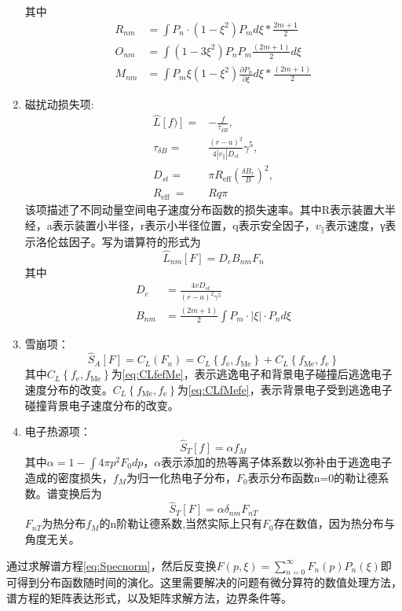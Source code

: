 \begin{enumerate}
\begin{equation}
\end{equation}
其中
\begin{align}R_{n m} & = \int P_{n} \cdot\left(1-\xi^{2}\right) P_{m} d \xi * \frac{2 m+1}{2} \\O_{n m} & = \int\left(1-3 \xi^{2}\right) P_{n} P_{m} \frac{(2 m+1)}{2} d \xi \\M_{n m} & = \int P_{m} \xi\left(1-\xi^{2}\right) \frac{\partial P_{n}}{\partial \xi} d \xi * \frac{(2 m+1)}{2}\end{align}
\item
磁扰动损失项\cite{RN2076}:
\begin{equation}
\begin{aligned}\widehat{L}[f)]  = &-\frac{f}{\tau_{\delta B}}, \\\tau_{\delta B}  = &\frac{(r-a)^{2}}{4\left|v_{\|}\right| D_{s t}} \gamma^{5}, \\D_{s t} = &\pi R_{\mathrm{eff}}\left(\frac{\delta B_{r}}{B}\right)^{2}, \\R_{\text {eff }}  = &R q \pi\end{aligned}
\end{equation}
该项描述了不同动量空间电子速度分布函数的损失速率。其中R表示装置大半经，a表示装置小半径，r表示小半径位置，q表示安全因子，$v_∥$表示速度，γ表示洛伦兹因子。写为谱算符的形式为
\begin{equation}
\widehat{L}_{n m}[F]=D_{c} B_{n m} F_{n}
\end{equation}
其中
\begin{align}D_{c} & = \frac{4 v D_{s t}}{(r-a)^{2} \gamma^{5}} \\B_{n m} & = \frac{(2 m+1)}{2} \int P_{m} \cdot|\xi| \cdot P_{n} d \xi\end{align}

\item
雪崩项：
\begin{equation}
\hat{S}_{A}[F]=C_{L}\left(F_{n}\right)=C_{L}\left\{f_{\mathrm{e}}, f_{\mathrm{Me}}\right\}+C_{L}\left\{f_{\mathrm{Me}}, f_{\mathrm{e}}\right\}
\end{equation}
其中$C_{L}\left\{f_{\mathrm{e}}, f_{\mathrm{Me}}\right\}$为\autoref{eq:CLfefMe}，表示逃逸电子和背景电子碰撞后逃逸电子速度分布的改变。$C_{L}\left\{f_{\mathrm{Me}}, f_{\mathrm{e}}\right\}$为\autoref{eq:CLfMefe}，表示背景电子受到逃逸电子碰撞背景电子速度分布的改变。
\item
电子热源项：
\begin{equation}
\hat{S}_T[f]=\alpha f_M
\end{equation}
其中$α=1-∫4πp^2 F_0 dp$，$α$表示添加的热等离子体系数以弥补由于逃逸电子造成的密度损失，$f_M$为归一化热电子分布，$F_0$表示分布函数n=0的勒让德系数。谱变换后为
\begin{equation}
\hat{S}_{T}[F]=\alpha \delta_{n m} F_{n T}
\end{equation}
$F_{nT}$为热分布$f_M$的n阶勒让德系数,当然实际上只有$F_0$存在数值，因为热分布与角度无关。
\end{enumerate}\par
通过求解谱方程\eqref{eq:Specnorm}，然后反变换$F(p, \xi)=\sum_{n=0}^{\infty} F_{n}(p) P_{n}(\xi)$即可得到分布函数随时间的演化。这里需要解决的问题有微分算符的数值处理方法，谱方程的矩阵表达形式，以及矩阵求解方法，边界条件等。
